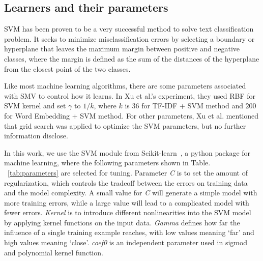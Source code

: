 \documentclass[sigconf,review, anonymous]{acmart}
\theoremstyle{break}
\begin{document}
\begin{table}[htp]
   \caption {List of Parameters Tuned by This Paper.}
\centering
{}
\label{tab:parameters}
\end{table}

\subsection{Learners and their parameters}
SVM has been proven to be a very successful method to solve
text classification problem. It seeks to minimize misclassification
errors by selecting a boundary or hyperplane that leaves
the maximum margin between positive and negative classes, where the
margin is defined as the sum of the distances of the
hyperplane from the closest point of the two classes\cite{joachims1998text}.

Like most machine learning algorithms, there are some parameters associated with
SMV to control how it learns.  In Xu et al.'s experiment, they used RBF for SVM kernel
and set $\gamma$ to $1/k$, where $k$ is $36$ for TF-IDF + SVM method
and $200$ for Word Embedding + SVM method. For other parameters, 
Xu et al. mentioned that grid search was applied to optimize the SVM parameters, 
but no further information disclose. 

In this work, we use the SVM module from Scikit-learn~\cite{scikit-learn}, a python package for machine learning,
where the following parameters shown in Table. ~\ref{tab:parameters} are selected for tuning.
Parameter {\it C} is to set the amount of regularization, which controls the tradeoff between
the errors on training data and the model complexity.  A small value for {\it C} will generate 
a simple model with more training errors, while a large value will lead to a complicated model with fewer
errors. {\it Kernel} is to introduce different nonlinearities into the SVM model by applying kernel functions
on the input data. {\it Gamma } defines how far the influence of a single training example reaches, 
with low values meaning `far' and high values meaning `close'. {\it coef0} is an independent parameter used
in sigmod and  polynomial kernel function.
\end{document}
